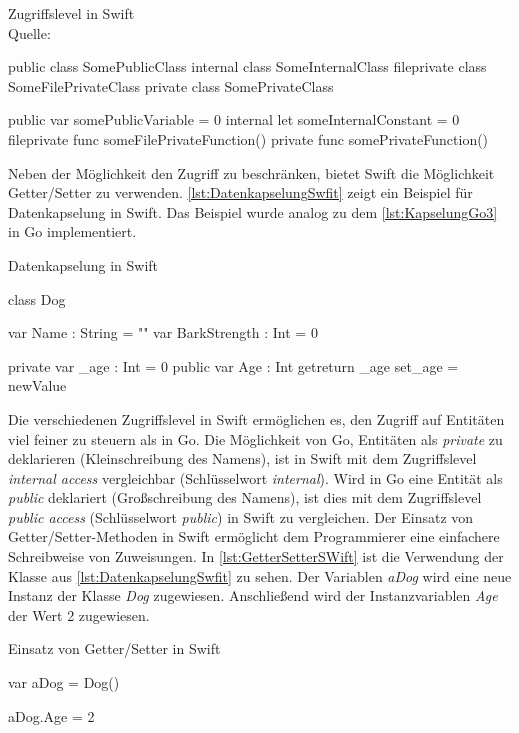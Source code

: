 \begin{listing}[H]
\caption{Zugriffslevel in Swift \\ Quelle:\cite[S.396]{Apple.2017}}
\label{lst:ZugriffslevelSwift}
\begin{SwiftCode}
public class SomePublicClass {}
internal class SomeInternalClass {}
fileprivate class SomeFilePrivateClass {}
private class SomePrivateClass {}

public var somePublicVariable = 0
internal let someInternalConstant = 0
fileprivate func someFilePrivateFunction() {}
private func somePrivateFunction() {}
\end{SwiftCode}
\end{listing}

Neben der Möglichkeit den Zugriff zu beschränken, bietet Swift die Möglichkeit Getter/Setter zu verwenden.
\autoref{lst:DatenkapselungSwfit} zeigt ein Beispiel für Datenkapselung in Swift. 
Das Beispiel wurde analog zu dem \autoref{lst:KapselungGo3} in Go implementiert.

\begin{listing}[H]
\caption{Datenkapselung in Swift}
\label{lst:DatenkapselungSwfit}
\begin{SwiftCode}
class Dog {
    var Name : String = ""
    var BarkStrength : Int = 0
	
    private var _age : Int = 0
    public var Age : Int {
        get{return _age}
        set{_age = newValue}
    }
}
\end{SwiftCode}
\end{listing}

Die verschiedenen Zugriffslevel in Swift ermöglichen es, den Zugriff auf Entitäten viel feiner zu steuern als in Go.
Die Möglichkeit von Go, Entitäten als \textit{private} zu deklarieren (Kleinschreibung des Namens), ist in Swift mit dem Zugriffslevel \textit{internal access} vergleichbar (Schlüsselwort \textit{internal}). 
Wird in Go eine Entität als \textit{public} deklariert (Großschreibung des Namens), ist dies mit dem Zugriffslevel \textit{public access} (Schlüsselwort \textit{public}) in Swift zu vergleichen.
Der Einsatz von Getter/Setter-Methoden in Swift ermöglicht dem Programmierer eine einfachere Schreibweise von Zuweisungen. 
In \autoref{lst:GetterSetterSWift} ist die Verwendung der Klasse aus \autoref{lst:DatenkapselungSwfit} zu sehen. 
Der Variablen \textit{aDog} wird eine neue Instanz der Klasse \textit{Dog} zugewiesen.
Anschließend wird der Instanzvariablen \textit{Age} der Wert 2 zugewiesen.

\begin{listing}[H]
\caption{Einsatz von Getter/Setter in Swift}
\label{lst:GetterSetterSWift}
\begin{SwiftCode}
var aDog = Dog()

aDog.Age = 2

\end{SwiftCode}
\end{listing}

